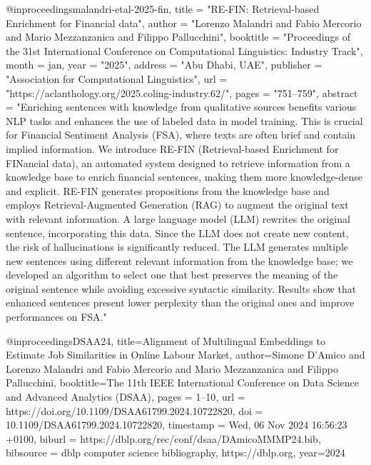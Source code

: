 @inproceedings{malandri-etal-2025-fin,
    title = "{RE}-{FIN}: Retrieval-based Enrichment for Financial data",
    author = "Lorenzo Malandri and Fabio Mercorio and Mario Mezzanzanica and Filippo Pallucchini",
    booktitle = "Proceedings of the 31st International Conference on Computational Linguistics: Industry Track",
    month = jan,
    year = "2025",
    address = "Abu Dhabi, UAE",
    publisher = "Association for Computational Linguistics",
    url = "https://aclanthology.org/2025.coling-industry.62/",
    pages = "751--759",
    abstract = "Enriching sentences with knowledge from qualitative sources benefits various NLP tasks and enhances the use of labeled data in model training. This is crucial for Financial Sentiment Analysis (FSA), where texts are often brief and contain implied information. We introduce RE-FIN (Retrieval-based Enrichment for FINancial data), an automated system designed to retrieve information from a knowledge base to enrich financial sentences, making them more knowledge-dense and explicit. RE-FIN generates propositions from the knowledge base and employs Retrieval-Augmented Generation (RAG) to augment the original text with relevant information. A large language model (LLM) rewrites the original sentence, incorporating this data. Since the LLM does not create new content, the risk of hallucinations is significantly reduced. The LLM generates multiple new sentences using different relevant information from the knowledge base; we developed an algorithm to select one that best preserves the meaning of the original sentence while avoiding excessive syntactic similarity. Results show that enhanced sentences present lower perplexity than the original ones and improve performances on FSA."
}

@inproceedings{DSAA24,
  title={Alignment of Multilingual Embeddings to Estimate Job Similarities in Online Labour Market},
  author={Simone D'Amico and Lorenzo Malandri and Fabio Mercorio and Mario Mezzanzanica and Filippo Pallucchini},
  booktitle={The 11th IEEE International Conference on Data Science and Advanced Analytics (DSAA)},
   pages        = {1--10},
  url          = {https://doi.org/10.1109/DSAA61799.2024.10722820},
  doi          = {10.1109/DSAA61799.2024.10722820},
  timestamp    = {Wed, 06 Nov 2024 16:56:23 +0100},
  biburl       = {https://dblp.org/rec/conf/dsaa/DAmicoMMMP24.bib},
  bibsource    = {dblp computer science bibliography, https://dblp.org},
  year={2024}
}

